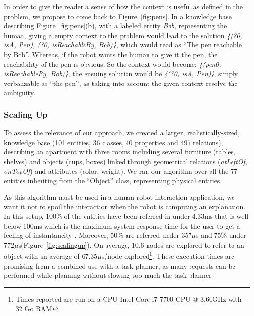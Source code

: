 \documentclass[a4paper,11pt,twoside]{StyleThese}
\begin{document}
In order to give the reader a sense of how the context is useful as defined in the problem, we propose to come back to Figure~\ref{fig:pens}.
In a knowledge base describing Figure~\ref{fig:pens}(b), with a labeled entity \textit{Bob}, representing the human, giving a empty context to the problem would lead to the solution \textit{\{(?0, isA, Pen), (?0, isReachableBy, Bob)\}}, which would read as ``The pen reachable by Bob''. Whereas, if the robot wants the human to give it the pen, the reachability of the pen is obvious. So the context would become: \textit{\{(pen0, isReachableBy, Bob)\}}, the ensuing solution would be \textit{\{(?0, isA, Pen)\}}, simply verbalizable as ``the pen'', as taking into account the given context resolve the ambiguity.

\subsubsection{Scaling Up}

To assess the relevance of our approach, we created a larger, realistically-sized, knowledge base (101 entities, 36 classes, 40 properties and 497 relations), describing an apartment with three rooms including several furniture (tables, shelves) and objects (cups, boxes) linked through geometrical relations (\textit{atLeftOf}, \textit{onTopOf}) and attributes (color, weight).
We ran our algorithm over all the 77 entities inheriting from the ``Object'' class, representing physical entities. 

\newcommand{\us}{$\mu$s\xspace}

As this algorithm must be used in a human robot interaction application, we want it not to spoil the interaction when the robot is computing an explanation. In this setup, 100\% of the entities have been referred in under 4.33ms that is well below 100ms which is the maximum system response time for the user to get a feeling of instantaneity \cite{miller1968response}. Moreover, 50\% are referred under 357\us and 75\% under 772\us (Figure~\ref{fig:scalingup}). On average, 10.6 nodes are explored to refer to an object with an average of 67.35\us/node explored\footnote{Times reported are run on a CPU Intel Core i7-7700 CPU @ 3.60GHz with 32 Go RAM}. These execution times are promising from a combined use with a task planner, as many requests can be performed while planning without slowing too much the task planner.
\end{document}
